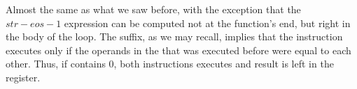 \myparagraphold{\OptimizingKeilVI (\ARMMode)}




Almost the same as what we saw before, with the exception that the $str - eos - 1$ 
expression can be computed not at the function's end, but right in the body of the loop.
The  suffix, as we may recall, implies that the instruction executes only if the operands in
the \CMP that was executed before were equal to each other.
Thus, if  contains 0, both  instructions executes and result is left in the  register.

